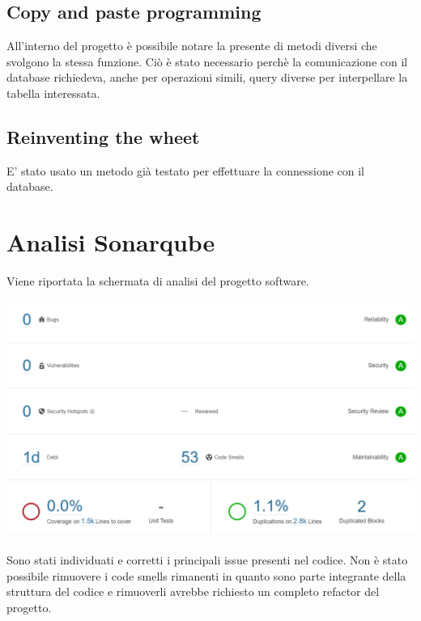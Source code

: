 \documentclass[a4paper, titlepage]{article}
\begin{document}
\subsection{Copy and paste programming}
All’interno del progetto è possibile notare la presente di metodi diversi che svolgono la stessa funzione. Ciò è stato necessario perchè la comunicazione con il database richiedeva, anche per operazioni simili, query diverse per interpellare la tabella interessata.
\subsection{Reinventing the wheet}
E' stato usato un metodo già testato per effettuare la connessione con il database.

\section{Analisi Sonarqube}
Viene riportata la schermata di analisi del progetto software.\\\\
\includegraphics[scale=0.60]{Immagini/form/Sonarqube.png}
\\\\
Sono stati individuati e corretti i principali issue presenti nel codice.
Non è stato possibile rimuovere i code smells rimanenti in quanto sono parte integrante della struttura del codice e rimuoverli avrebbe richiesto un completo refactor del progetto.
\end{document}
